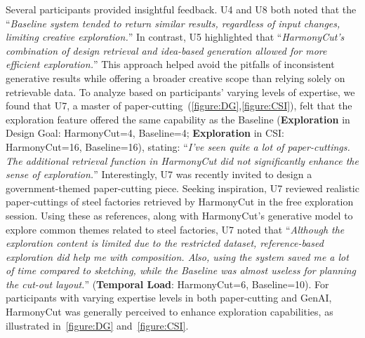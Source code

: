 Several participants provided insightful feedback. U4 and U8 both noted that the ``\textit{Baseline system tended to return similar results, regardless of input changes, limiting creative exploration.}'' In contrast, U5 highlighted that ``\textit{HarmonyCut's combination of design retrieval and idea-based generation allowed for more efficient exploration.}'' This approach helped avoid the pitfalls of inconsistent generative results while offering a broader creative scope than relying solely on retrievable data.
To analyze based on participants' varying levels of expertise, we found that U7, a master of paper-cutting~(\autoref{figure:DG},\autoref{figure:CSI}), felt that the exploration feature offered the same capability as the Baseline (\textbf{Exploration} in Design Goal: HarmonyCut=4, Baseline=4; \textbf{Exploration} in CSI: HarmonyCut=16, Baseline=16), stating: ``\textit{I've seen quite a lot of paper-cuttings. The additional retrieval function in HarmonyCut did not significantly enhance the sense of exploration.}'' Interestingly, U7 was recently invited to design a government-themed paper-cutting piece. Seeking inspiration, U7 reviewed realistic paper-cuttings of steel factories retrieved by HarmonyCut in the free exploration session. Using these as references, along with HarmonyCut's generative model to explore common themes related to steel factories, U7 noted that ``\textit{Although the exploration content is limited due to the restricted dataset, reference-based exploration did help me with composition. Also, using the system saved me a lot of time compared to sketching, while the Baseline was almost useless for planning the cut-out layout.}'' (\textbf{Temporal Load}: HarmonyCut=6, Baseline=10). For participants with varying expertise levels in both paper-cutting and GenAI, HarmonyCut was generally perceived to enhance exploration capabilities, as illustrated in~\autoref{figure:DG} and~\autoref{figure:CSI}.


